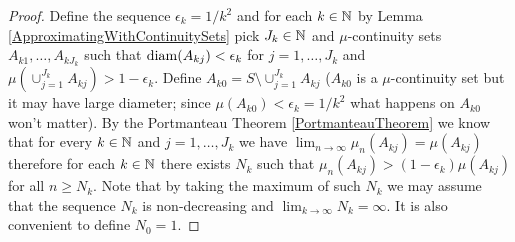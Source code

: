 \begin{proof}
Define the sequence $\epsilon_k = 1/k^2$ and for each $k \in \mathbb{N}$ by Lemma \ref{ApproximatingWithContinuitySets} pick $J_k \in \mathbb{N}$ and $\mu$-continuity sets $A_{k1}, \dotsc, A_{kJ_k}$ such that $\operatorname*{diam}(A_{kj}) < \epsilon_k$ for $j=1, \dotsc, J_k$ and $\mu \left( \cup_{j=1}^{J_k} A_{kj} \right) > 1 - \epsilon_k$.  Define $A_{k0} = S \setminus \cup_{j=1}^{J_k} A_{kj}$ ($A_{k0}$ is a $\mu$-continuity set but it may have large diameter; since $\mu(A_{k0}) < \epsilon_k=1/k^2$ what happens on $A_{k0}$ won't matter).  By the Portmanteau Theorem \ref{PortmanteauTheorem} we know that for every $k \in \mathbb{N}$ and $j=1, \dotsc, J_k$ we have $\lim_{n \to \infty} \mu_n(A_{kj}) = \mu(A_{kj})$ therefore for each $k \in \mathbb{N}$ there exists $N_k$ such that $\mu_n(A_{kj}) > (1 - \epsilon_k) \mu(A_{kj})$ for all $n \geq N_k$.  Note that by taking the maximum of such $N_k$ we may assume that the sequence $N_k$ is non-decreasing and $\lim_{k \to \infty} N_k = \infty$.  It is also convenient to define $N_0 = 1$.


\end{proof}
